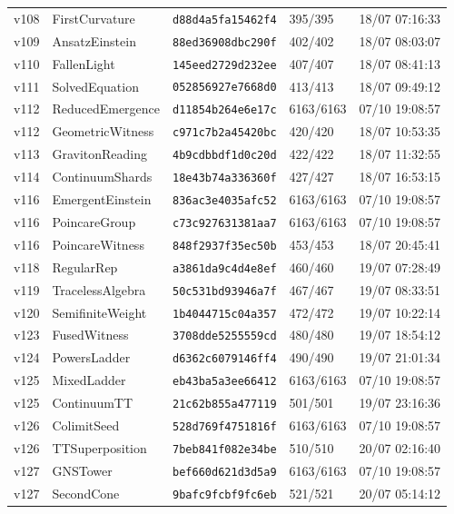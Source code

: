 \documentclass[11pt]{article}
\theoremstyle{definition}\newtheorem{deriv}{Derivation}
\begin{document}
{\begin{longtable}{@{}lllll@{}}
v108 & FirstCurvature & \texttt{d88d4a5fa15462f4} & 395/395 & 18/07 07:16:33 \\
v109 & AnsatzEinstein & \texttt{88ed36908dbc290f} & 402/402 & 18/07 08:03:07 \\
v110 & FallenLight & \texttt{145eed2729d232ee} & 407/407 & 18/07 08:41:13 \\
v111 & SolvedEquation & \texttt{052856927e7668d0} & 413/413 & 18/07 09:49:12 \\
v112 & ReducedEmergence & \texttt{d11854b264e6e17c} & 6163/6163 & 07/10 19:08:57 \\
v112 & GeometricWitness & \texttt{c971c7b2a45420bc} & 420/420 & 18/07 10:53:35 \\
v113 & GravitonReading & \texttt{4b9cdbbdf1d0c20d} & 422/422 & 18/07 11:32:55 \\
v114 & ContinuumShards & \texttt{18e43b74a336360f} & 427/427 & 18/07 16:53:15 \\
v116 & EmergentEinstein & \texttt{836ac3e4035afc52} & 6163/6163 & 07/10 19:08:57 \\
v116 & PoincareGroup & \texttt{c73c927631381aa7} & 6163/6163 & 07/10 19:08:57 \\
v116 & PoincareWitness & \texttt{848f2937f35ec50b} & 453/453 & 18/07 20:45:41 \\
v118 & RegularRep & \texttt{a3861da9c4d4e8ef} & 460/460 & 19/07 07:28:49 \\
v119 & TracelessAlgebra & \texttt{50c531bd93946a7f} & 467/467 & 19/07 08:33:51 \\
v120 & SemifiniteWeight & \texttt{1b4044715c04a357} & 472/472 & 19/07 10:22:14 \\
v123 & FusedWitness & \texttt{3708dde5255559cd} & 480/480 & 19/07 18:54:12 \\
v124 & PowersLadder & \texttt{d6362c6079146ff4} & 490/490 & 19/07 21:01:34 \\
v125 & MixedLadder & \texttt{eb43ba5a3ee66412} & 6163/6163 & 07/10 19:08:57 \\
v125 & ContinuumTT & \texttt{21c62b855a477119} & 501/501 & 19/07 23:16:36 \\
v126 & ColimitSeed & \texttt{528d769f4751816f} & 6163/6163 & 07/10 19:08:57 \\
v126 & TTSuperposition & \texttt{7beb841f082e34be} & 510/510 & 20/07 02:16:40 \\
v127 & GNSTower & \texttt{bef660d621d3d5a9} & 6163/6163 & 07/10 19:08:57 \\
v127 & SecondCone & \texttt{9bafc9fcbf9fc6eb} & 521/521 & 20/07 05:14:12 \\

\end{longtable}}
\end{document}
